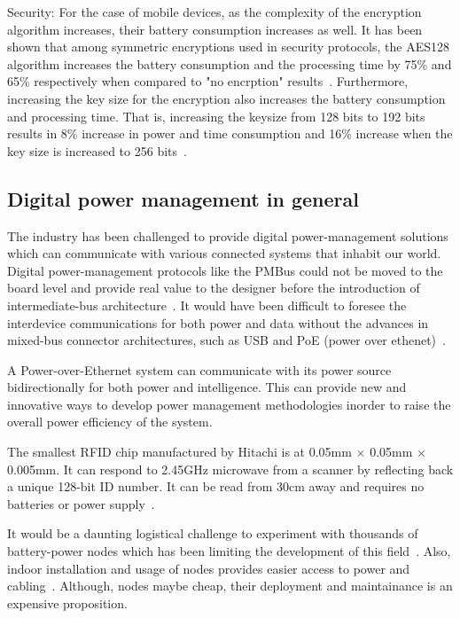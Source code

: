\documentclass[final]{siamltex}
\begin{document}
Security:
For the case of mobile devices, as the complexity of the encryption algorithm
increases, their battery consumption increases as well. It has been shown that
among symmetric encryptions used in security protocols, the AES128 algorithm
increases the battery consumption and the processing time by 75\% and 65\%
respectively when compared to "no encrption" results~\cite{hamad2009energy}.
Furthermore, increasing the key size for the encryption also increases the
battery consumption and processing time. That is, increasing the keysize from
128 bits to 192 bits results in 8\% increase in power and time consumption and
16\% increase when the key size is increased to 256
bits~\cite{hamad2009energy}.

\subsection{Digital power management in general}

The industry has been challenged to provide digital power-management solutions
which can communicate with various connected systems that inhabit our world.
Digital power-management protocols like the PMBus could not be moved to the
board level and provide real value to the designer before the introduction of
intermediate-bus architecture~\cite{FutureIOT}. It would have been difficult to
foresee the interdevice communications for both power and data without the
advances in mixed-bus connector architectures, such as USB and PoE (power over
ethenet)~\cite{FutureIOT}. 

A Power-over-Ethernet system can communicate with its power source
bidirectionally for both power and intelligence. This can provide new and
innovative ways to develop power management methodologies inorder to raise the
overall power efficiency of the system.

%
%

The smallest RFID chip manufactured by Hitachi is at 0.05mm $\times$ 0.05mm
$\times$ 0.005mm. It can respond to 2.45GHz microwave from a scanner by
reflecting back a unique 128-bit ID number. It can be read from 30cm away and
requires no batteries or power supply~\cite{hornyak2008rfid}.

It would be a daunting logistical challenge to experiment with thousands of
battery-power nodes which has been limiting the development of this
field~\cite{gluhak2011survey}. Also, indoor installation and usage of nodes
provides easier access to power and cabling~\cite{gluhak2011survey}. Although,
nodes maybe cheap, their deployment and maintainance is an expensive
proposition.
\end{document}
